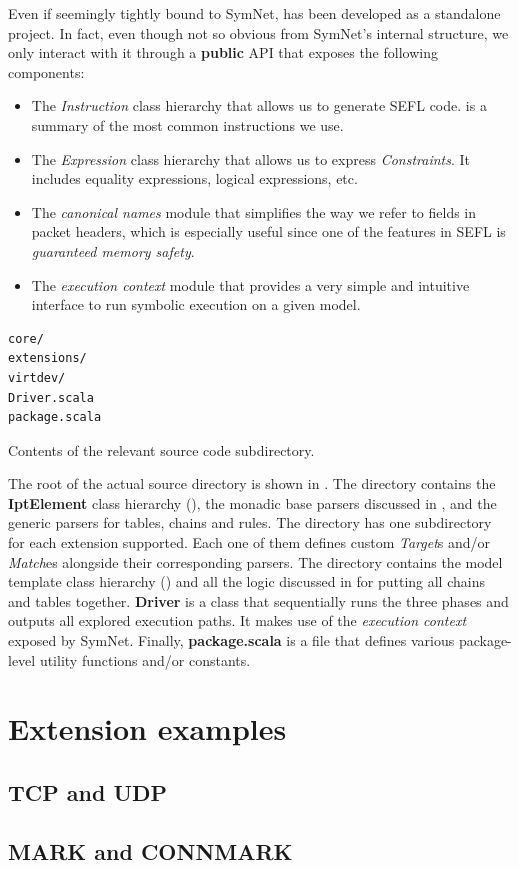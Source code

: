 Even if seemingly tightly bound to SymNet, \TOOL has been developed as a
standalone project.  In fact, even though not so obvious from SymNet's internal
structure, we only interact with it through a \textbf{public}
API that exposes the following
components:
\begin{itemize}
  \item The \emph{Instruction} class hierarchy that allows us to generate SEFL
    code.   is a summary of the most
    common instructions we use.
  \item The \emph{Expression} class hierarchy that allows us to express
    \emph{Constraints}.  It includes equality expressions, logical expressions,
    etc.
  \item The \emph{canonical names} module that simplifies the way we refer to
    fields in packet headers, which is especially useful since one of the
    features in SEFL is \emph{guaranteed memory safety}.
  \item The \emph{execution context} module that provides a very simple and
    intuitive interface to run symbolic execution on a given model.
\end{itemize}

\begin{listing}
  \lstset{numbers=none, frame=single, basicstyle=\ttfamily,
    xleftmargin=0.30\textwidth, xrightmargin=0.30\textwidth
  }
  \begin{lstlisting}
core/
extensions/
virtdev/
Driver.scala
package.scala
  \end{lstlisting}
  \caption{Contents of the relevant source code subdirectory.}
  \label{lst:root-directory}
\end{listing}

The root of the actual source directory is shown in
.  The  directory
contains the \textbf{IptElement} class hierarchy
(), the monadic base parsers discussed
in , and the generic parsers for tables,
chains and rules.  The  directory has one subdirectory for
each extension supported.  Each one of them defines custom \emph{Target}s
and/or \emph{Match}es alongside their corresponding parsers.  The
 directory contains the model template class hierarchy
() and all the logic discussed in
 for putting all chains and tables
together.  \textbf{Driver} is a class that sequentially runs the three phases
and outputs all explored execution paths.  It makes use of the \emph{execution
context} exposed by SymNet.  Finally, \textbf{package.scala} is a file that
defines various package-level utility functions and/or constants.


\section{Extension examples}
\subsection{TCP and UDP}
\subsection{MARK and CONNMARK}
